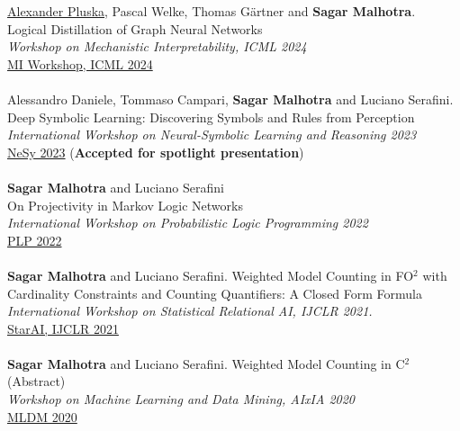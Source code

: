 \documentclass[10pt, a4paper]{article}
\newcommand{\years}[1]{\marginnote{\scriptsize #1}}
\begin{document}
\years{2024}\underline{Alexander Pluska}, Pascal Welke, Thomas G{\"a}rtner and \textbf{Sagar Malhotra}.\\
Logical Distillation of Graph Neural Networks\\
\emph{Workshop on Mechanistic Interpretability, ICML 2024}\\
\href{https://openreview.net/forum?id=TfYnD2gYRO}{MI Workshop, ICML 2024}\\ \\
\years{2023}Alessandro Daniele, Tommaso Campari, \textbf{Sagar Malhotra} and Luciano Serafini. \\ Deep Symbolic Learning: Discovering Symbols and Rules from Perception \\  
\emph{International Workshop on Neural-Symbolic Learning and Reasoning 2023}\\
\href{https://sites.google.com/view/nesy2023/home/nesy2023-programme-outline?authuser=0}{NeSy 2023} (\textbf{Accepted for spotlight presentation})\\ \\
\years{2022}\textbf{Sagar Malhotra} and Luciano Serafini\\
On Projectivity in Markov Logic Networks\\ 
\emph{International Workshop on Probabilistic Logic Programming 2022}\\ \href{https://easychair.org/publications/preprint/2lTk}{ PLP 2022}\\ \\
\years{2021}\textbf{Sagar Malhotra} and Luciano Serafini. Weighted Model Counting in FO$^2$ with Cardinality Constraints and Counting Quantifiers: A Closed Form Formula\\ \emph{International Workshop on Statistical Relational AI, IJCLR 2021. }\\
\href{https://starai.cs.kuleuven.be/2021/}{ StarAI, IJCLR 2021} \\ \\ 
\years{{2020}}\textbf{Sagar Malhotra} and Luciano Serafini. Weighted Model Counting in C$^2$ (Abstract) \\
\emph{Workshop on Machine Learning and Data Mining, AIxIA 2020}\\
 \href{https://sites.google.com/view/mldm2020-workshop/program?authuser=0}{MLDM 2020}
\end{document}
